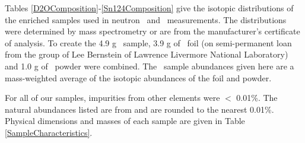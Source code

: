\label{SampleComposition}
Tables \ref{D2OComposition}-\ref{Sn124Composition} give the isotopic
distributions of the 
enriched samples used in neutron \tot\ and \el\ measurements. The distributions
were determined by mass spectrometry or are from the manufacturer's certificate of analysis. 
To create the 4.9 g \snTwelve\ sample, 3.9 g of \snTwelve\ foil
(on semi-permanent loan from the group of Lee Bernstein of Lawrence Livermore
National Laboratory) and 1.0 g of
\snTwelve\ powder were combined. The
\snTwelve\ sample abundances given here are a mass-weighted average of the isotopic
abundances of the foil and powder.

For all of our samples, impurities from other elements were $<$ 0.01\%.
The natural abundances listed are from \cite{TICE1997} and are rounded to the nearest 0.01\%.
Physical dimensions and masses of each sample are given in Table \ref{SampleCharacteristics}.

